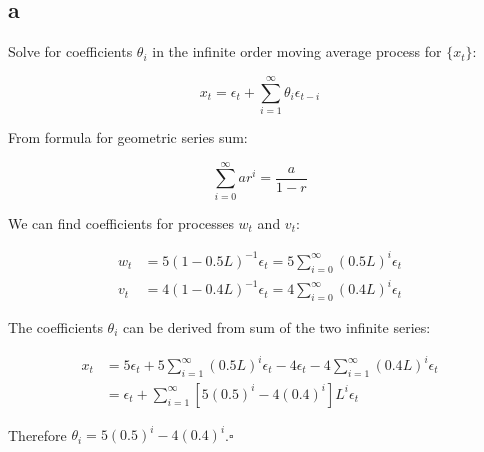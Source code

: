 \subsection{a} 
\label{section_2_a}
Solve for coefficients $\theta_i$ in the infinite order moving average process for $\{x_t\}$:

\begin{equation}
\nonumber
x_t = \epsilon_t + \sum_{i=1}^{\infty} \theta_i\epsilon_{t-i}
\end{equation}


\begin{solution}
From formula for geometric series sum:

\begin{equation}
\nonumber
\sum_{i=0}^{\infty}ar^i = \frac{a}{1-r}
\end{equation}

We can find coefficients for processes $w_t$ and $v_t$:

\begin{equation}
\begin{aligned}
w_t & = 5(1 - 0.5L)^{-1}\epsilon_t = 5\sum_{i=0}^{\infty} (0.5L)^i \epsilon_t \\
v_t & = 4(1 - 0.4L)^{-1}\epsilon_t = 4\sum_{i=0}^{\infty} (0.4L)^i \epsilon_t
\end{aligned}
\end{equation}

The coefficients $\theta_i$ can be derived from sum of the two infinite series:

\begin{equation}
\begin{aligned}
x_t & = 5\epsilon_t + 5\sum_{i=1}^{\infty} (0.5L)^i \epsilon_t - 4\epsilon_t - 4\sum_{i=1}^{\infty} (0.4L)^i \epsilon_t\\
    & = \epsilon_t + \sum_{i=1}^{\infty}  \left[5(0.5)^i - 4(0.4)^i\right] L^i \epsilon_t
\end{aligned}
\end{equation}

Therefore $\theta_i = 5(0.5)^i - 4(0.4)^i$.$\square$

\end{solution}